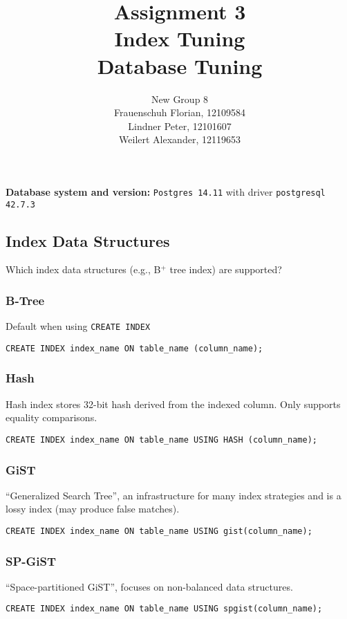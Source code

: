 \documentclass[11pt]{scrartcl}
\title{
  \textbf{\large Assignment 3} \\
  Index Tuning \\
  {\large Database Tuning}}
\author{
  New Group 8 \\
  \large Frauenschuh Florian, 12109584 \\
  \large Lindner Peter, 12101607 \\
  \large Weilert Alexander, 12119653
}
\begin{document}
\maketitle

\textbf{Database system and version:} \texttt{Postgres 14.11} with driver \texttt{postgresql 42.7.3} \\

\subsection{Index Data Structures}

Which index data structures (e.g., B$^+$ tree index) are supported?

\subsubsection*{B-Tree \cite{PostgreSQL2024IndexTypes}}
Default when using \texttt{CREATE INDEX}
\begin{lstlisting}[style=dbtsql]
CREATE INDEX index_name ON table_name (column_name);
\end{lstlisting}

\subsubsection*{Hash \cite{PostgreSQL2024IndexTypes}}
Hash index stores 32-bit hash derived from the indexed column. Only supports equality comparisons.
\begin{lstlisting}[style=dbtsql]
CREATE INDEX index_name ON table_name USING HASH (column_name);
\end{lstlisting}

\subsubsection*{GiST \cite{PostgreSQL2024IndexTypes} \cite{PostgreSQL2024GistGin}}
\enquote{Generalized Search Tree}, an infrastructure for many index strategies and is a lossy index (may produce false matches).
\begin{lstlisting}[style=dbtsql]
CREATE INDEX index_name ON table_name USING gist(column_name);
\end{lstlisting}

\subsubsection*{SP-GiST \cite{PostgreSQL2024IndexTypes}}
\enquote{Space-partitioned GiST}, focuses on non-balanced data structures.
\begin{lstlisting}[style=dbtsql]
CREATE INDEX index_name ON table_name USING spgist(column_name);
\end{lstlisting}
\end{document}
